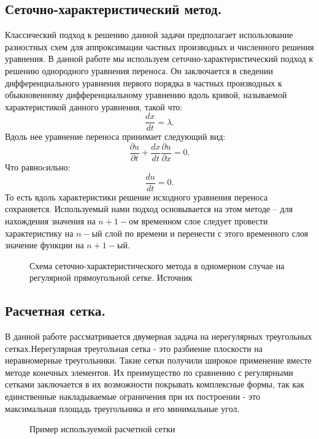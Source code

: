 \documentclass[14pt]{article}
\begin{document}
\subsection{Сеточно-характеристический метод.}
Классический подход к решению данной задачи предполагает использование разностных схем для аппроксимации частных производных и численного решения уравнения. В данной работе мы  используем сеточно-характеристический подход к решению однородного уравнения переноса. Он заключается в сведении дифференциального уравнения первого порядка в частных производных к обыкновенному дифференциальному уравнению вдоль кривой, называемой характеристикой данного уравнения, такой что:
\begin{equation}
\frac{dx}{dt}=\lambda.
\end{equation}
Вдоль нее уравнение переноса принимает следующий вид:
\begin{equation}
\frac{\partial u}{\partial t} + \frac{dx}{dt} \frac{\partial u}{\partial x}=0 .
\end{equation}
Что равноcильно:
\begin{equation}
\frac{du}{dt}=0.
\end{equation}
То есть вдоль характеристики решение исходного уравнения переноса сохраняется. Используемый нами подход основывается на этом методе – для нахождения значения на $n + 1 - ом$ временном слое следует провести характеристику на $n-ый$ слой по времени и перенести с этого временного слоя значение функции на $n+1-ый$.
\begin{figure}[!h]
\caption{Схема сеточно-характеристического метода в одномерном случае на регулярной прямоугольной сетке. Источник \cite{20}}
\label{pic1}
\end{figure}
\subsection{Расчетная сетка.}
 В данной работе рассматривается двумерная задача на нерегулярных треугольных сетках.Нерегулярная треугольная сетка - это разбиение плоскости на неравномерные треугольники. Такие сетки получили широкое применение вместе методе конечных элементов. Их преимущество по сравнению с регулярными сетками заключается в их возможности покрывать комплексные формы, так как единственные накладываемые ограничения при их построении - это максимальная площадь треугольника и его минимальные угол.
\begin{figure}[!h]
\caption{Пример используемой расчетной сетки}
\end{figure}
\end{document}
